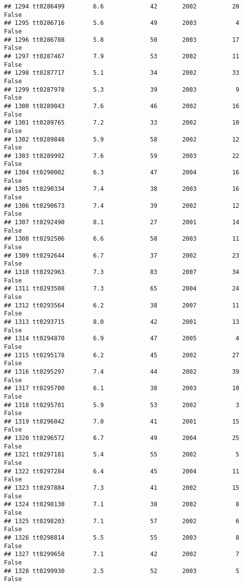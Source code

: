 \documentclass[
]{article}
\begin{document}
\begin{verbatim}
## 1294 tt0286499        6.6             42       2002          20   False
## 1295 tt0286716        5.6             49       2003           4   False
## 1296 tt0286788        5.8             50       2003          17   False
## 1297 tt0287467        7.9             53       2002          11   False
## 1298 tt0287717        5.1             34       2002          33   False
## 1299 tt0287978        5.3             39       2003           9   False
## 1300 tt0289043        7.6             46       2002          16   False
## 1301 tt0289765        7.2             33       2002          10   False
## 1302 tt0289848        5.9             58       2002          12   False
## 1303 tt0289992        7.6             59       2003          22   False
## 1304 tt0290002        6.3             47       2004          16   False
## 1305 tt0290334        7.4             38       2003          16   False
## 1306 tt0290673        7.4             39       2002          12   False
## 1307 tt0292490        8.1             27       2001          14   False
## 1308 tt0292506        6.6             58       2003          11   False
## 1309 tt0292644        6.7             37       2002          23   False
## 1310 tt0292963        7.3             83       2007          34   False
## 1311 tt0293508        7.3             65       2004          24   False
## 1312 tt0293564        6.2             38       2007          11   False
## 1313 tt0293715        8.0             42       2001          13   False
## 1314 tt0294870        6.9             47       2005           4   False
## 1315 tt0295178        6.2             45       2002          27   False
## 1316 tt0295297        7.4             44       2002          39   False
## 1317 tt0295700        6.1             38       2003          10   False
## 1318 tt0295701        5.9             53       2002           3   False
## 1319 tt0296042        7.0             41       2001          15   False
## 1320 tt0296572        6.7             49       2004          25   False
## 1321 tt0297181        5.4             55       2002           5   False
## 1322 tt0297284        6.4             45       2004          11   False
## 1323 tt0297884        7.3             41       2002          15   False
## 1324 tt0298130        7.1             38       2002           8   False
## 1325 tt0298203        7.1             57       2002           6   False
## 1326 tt0298814        5.5             55       2003           8   False
## 1327 tt0299658        7.1             42       2002           7   False
## 1328 tt0299930        2.5             52       2003           5   False

\end{verbatim}
\end{document}
